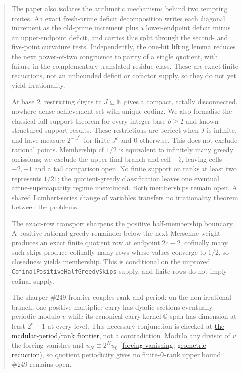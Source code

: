 \documentclass[11pt]{article}
\newcommand{\commit}{bb4e24651b37cd096d3749ef299c3317930b3a3b}
\newcommand{\repobase}{https://github.com/wcook04/plectis-lean-erdos249-257/blob/\commit}
\newcommand{\PK}{Erdos249257}
\newcommand{\lword}[4]{\href{\repobase/\PK/#1\#L#2}{#4}}
\theoremstyle{definition}
\theoremstyle{remark}
\newcommand{\N}{\mathbb{N}}
\begin{document}
\begin{abstract}
The paper also isolates the arithmetic mechanisms behind two tempting routes.
An exact fresh-prime deficit decomposition writes each diagonal increment as
the old-prime increment plus a lower-endpoint deficit minus an upper-endpoint
deficit, and carries this split through the second- and five-point curvature
tests.  Independently, the one-bit lifting lemma reduces the next power-of-two
congruence to parity of a single quotient, with failure in the complementary
translated residue class.  These are exact finite reductions, not an
unbounded deficit or cofactor supply, so they do not yet yield irrationality.

At base $2$, restricting digits to $J\subseteq\N$ gives a compact, totally
disconnected, nowhere-dense achievement set with unique coding.  We also
formalise the classical full-support theorem for every integer base $b\ge2$
and known structured-support results.  These restrictions are perfect when
$J$ is infinite, and have measure $2^{-|J^c|}$ for finite $J^c$ and $0$
otherwise.  This does not exclude
rational points. Membership of $1/2$ is equivalent to infinitely many greedy
omissions; we exclude the upper final branch and cell $-3$, leaving cells
$-2,-1$ and a tail comparison open. No finite support on ranks at least two
represents $1/21$; the quotient-greedy classification leaves one eventual
affine-supercapacity regime unexcluded. Both memberships remain open. A
shared Lambert-series change of variables transfers no irrationality theorem
between the problems.

The exact-row transport sharpens the positive half-membership boundary.  A
positive rational greedy remainder below the next Mersenne weight produces
an exact finite quotient row at endpoint $2c-2$; cofinally many such skips
produce cofinally many rows whose values converge to $1/2$, so closedness
yields membership.  This is conditional on the unproved
\texttt{CofinalPositiveHalfGreedySkips} supply, and finite rows do not imply
cofinal supply.

The sharper \#249 frontier couples rank and period: on the non-irrational
branch, one positive-multiplier carry has dyadic sections eventually periodic
modulo $v$ while its canonical carry-kernel $\mathbb Q$-span has dimension at
least $2^e-1$ at every level.  This necessary conjunction is checked at
\lword{TotientTailCarryPeriod.lean}{224}{not_irrational_totientSeries_implies_mod_period_and_unbounded_rank}{the modular-period/rank frontier},
not a contradiction.  Modulo any divisor of $v$ the forcing vanishes and
$u_N\equiv2^Nu_0$
(\lword{TotientTailCarryPeriod.lean}{126}{totient_forcing_vanishes_mod_of_dvd_multiplier}{forcing vanishing};
\lword{TotientTailCarryPeriod.lean}{140}{totient_carry_modEq_geometric_of_dvd_multiplier}{geometric reduction}),
so quotient periodicity gives no finite-$\mathbb Q$-rank upper bound; \#249
remains open.

\end{abstract}
\end{document}

